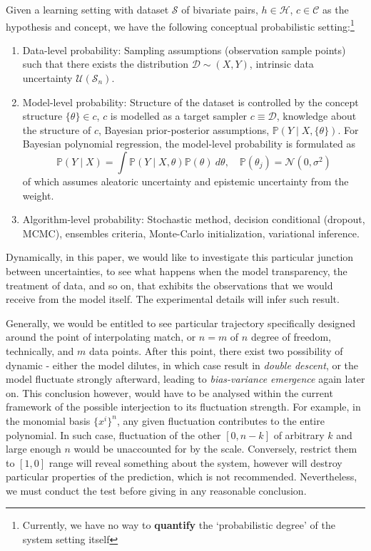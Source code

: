 \documentclass[10pt]{article} %
\begin{document}
\begin{definition}
    Given a learning setting with dataset $\mathcal{S}$ of bivariate pairs, $h\in \mathcal{H}$, $c\in \mathcal{C}$ as the hypothesis and concept, we have the following conceptual probabilistic setting:\footnote{Currently, we have no way to \textbf{quantify} the `probabilistic degree' of the system setting itself}
    \begin{enumerate}[leftmargin=2cm,itemsep=1pt,topsep=1pt]
        \item Data-level probability: Sampling assumptions (observation sample points) such that there exists the distribution $\mathcal{D}\sim (X,Y)$, intrinsic data uncertainty $\mathcal{U}(\mathcal{S}_{n})$. 
        \item Model-level probability: Structure of the dataset is controlled by the concept structure $\{\theta\}\in c$, $c$ is modelled as a target sampler $c\equiv \mathcal{D}$, knowledge about the structure of $c$, Bayesian prior-posterior assumptions, $\mathbb{P}(Y\mid X, \{\theta\})$. For Bayesian polynomial regression, the model-level probability is formulated as \begin{equation}
            \mathbb{P}(Y\mid X) = \int \mathbb{P}(Y\mid X,\theta)\mathbb{P}(\theta)\: d\theta, \quad \mathbb{P}(\theta_{j}) = \mathcal{N}(0,\sigma^{2})
        \end{equation}
        of which assumes aleatoric uncertainty and epistemic uncertainty from the weight. 
        \item Algorithm-level probability: Stochastic method, decision conditional (dropout, MCMC), ensembles criteria, Monte-Carlo initialization, variational inference. 
    \end{enumerate}
\end{definition}

Dynamically, in this paper, we would like to investigate this particular junction between uncertainties, to see what happens when the model transparency, the treatment of data, and so on, that exhibits the observations that we would receive from the model itself. The experimental details will infer such result. 

Generally, we would be entitled to see particular trajectory specifically designed around the point of interpolating match, or $n=m$ of $n$ degree of freedom, technically, and $m$ data points. After this point, there exist two possibility of dynamic - either the model dilutes, in which case result in \textit{double descent}, or the model fluctuate strongly afterward, leading to \textit{bias-variance emergence} again later on. This conclusion however, would have to be analysed within the current framework of the possible interjection to its fluctuation strength. For example, in the monomial basis $\{x^{i}\}^{n}$, any given fluctuation contributes to the entire polynomial. In such case, fluctuation of the other $[0,n-k]$ of arbitrary $k$ and large enough $n$ would be unaccounted for by the scale. Conversely, restrict them to $[1,0]$ range will reveal something about the system, however will destroy particular properties of the prediction, which is not recommended. Nevertheless, we must conduct the test before giving in any reasonable conclusion.
\end{document}
